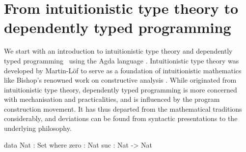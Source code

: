 \chapter{From intuitionistic type theory to dependently typed programming}
\label{chapter:background}

We start with an introduction to intuitionistic type theory \citep{ML-ITT} and dependently typed programming~\citep{Altenkirch-why-dependent-types-matter, McBride-Epigram} using the Agda language \citep{Norell-thesis, Norell-Agda, Bove-dependent-types-at-work}.
Intuitionistic type theory was developed by Martin-Löf to serve as a foundation of intuitionistic mathematics like Bishop's renowned work on constructive analysis \citep{Bishop-analysis}.
While originated from intuitionistic type theory, dependently typed programming is more concerned with mechanisation and practicalities, and is influenced by the program construction movement.
It has thus departed from the mathematical traditions considerably, and deviations can be found from syntactic presentations to the underlying philosophy.

\begin{code}
data Nat : Set where
  zero  :  Nat
  suc   :  Nat -> Nat
\end{code}
